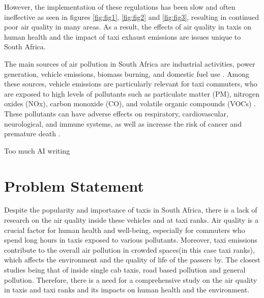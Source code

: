 \noindent
However, the implementation of these regulations has been slow and often ineffective as seen in figures \ref{fig:fig1}, \ref{fig:fig2} and \ref{fig:fig3}, resulting in continued poor air quality in many areas.
As a result, the effects of air quality in taxis on human health and the impact of taxi exhaust emissions are issues unique to South Africa.

\noindent
The main sources of air pollution in South Africa are industrial activities, power generation, vehicle emissions, biomass burning, and domestic fuel use \cite{Bylaws2023}. Among these sources, vehicle emissions are particularly relevant for taxi commuters, who are exposed to high levels of pollutants such as particulate matter (PM), nitrogen oxides (NOx), carbon monoxide (CO), and volatile organic compounds (VOCs) \cite{Venter2018}. These pollutants can have adverse effects on respiratory, cardiovascular, neurological, and immune systems, as well as increase the risk of cancer and premature death \cite{WHO2016}.


{\color{red} \huge Too much AI writing}
\section{Problem Statement}
Despite the popularity and importance of taxis in South Africa, there is a lack of research on the air quality inside these vehicles and at taxi ranks. 
Air quality is a crucial factor for human health and well-being, especially for commuters who spend long hours in taxis exposed to various pollutants.
Moreover, taxi emissions contribute to the overall air pollution in crowded spaces(in this case taxi ranks), which affects the environment and the quality of life of the passers by. The closest studies being that of inside single cab taxis\cite{insidetaxismall}, road based pollution\cite{taxiNetwork} and general pollution\cite{Environmentalimpact}.
Therefore, there is a need for a comprehensive study on the air quality in taxis and taxi ranks and its impacts on human health and the environment.

